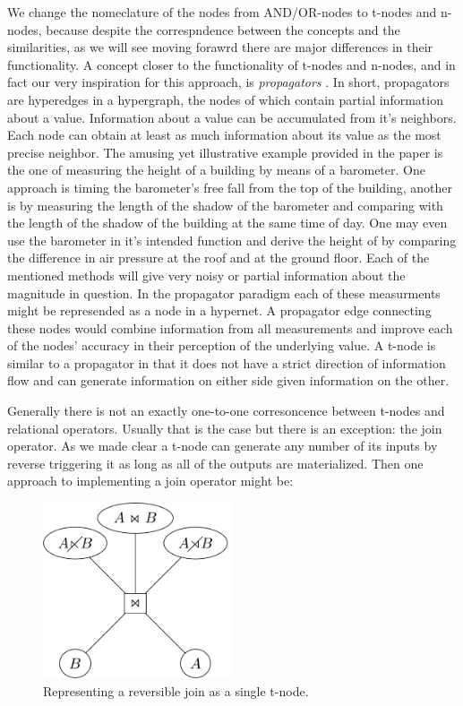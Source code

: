 We change the nomeclature of the nodes from AND/OR-nodes to t-nodes
and n-nodes, because despite the correspndence between the concepts
and the similarities, as we will see moving forawrd there are major
differences in their functionality. A concept closer to the
functionality of t-nodes and n-nodes, and in fact our very inspiration
for this approach, is \emph{propagators}
\cite{radulPropagationNetworksFlexible2009a}. In short, propagators are
hyperedges in a hypergraph, the nodes of which contain partial
information about a value. Information about a value can be
accumulated from it's neighbors. Each node can obtain at least as much
information about its value as the most precise neighbor. The amusing
yet illustrative example provided in the paper is the one of measuring
the height of a building by means of a barometer. One approach is
timing the barometer's free fall from the top of the building, another
is by measuring the length of the shadow of the barometer and
comparing with the length of the shadow of the building at the same
time of day. One may even use the barometer in it's intended function
and derive the height of by comparing the difference in air pressure
at the roof and at the ground floor. Each of the mentioned methods
will give very noisy or partial information about the magnitude in
question. In the propagator paradigm each of these measurments might
be represended as a node in a hypernet. A propagator edge connecting
these nodes would combine information from all measurements and
improve each of the nodes' accuracy in their perception of the
underlying value. A t-node is similar to a propagator in that it does
not have a strict direction of information flow and can generate
information on either side given information on the other.

Generally there is not an exactly one-to-one corresoncence between
t-nodes and relational operators. Usually that is the case but
there is an exception: the join operator. As we made clear a t-node
can generate any number of its inputs by reverse triggering it as
long as all of the outputs are materialized. Then one approach to
implementing a join operator might be:

\begin{figure}[p]
  \centering
  \includegraphics[width=0.5\textwidth]{./imgs/naivejoinnet.pdf}
  \caption{\label{fig:org78bb458}Representing a reversible join as a single t-node.}
\end{figure}


